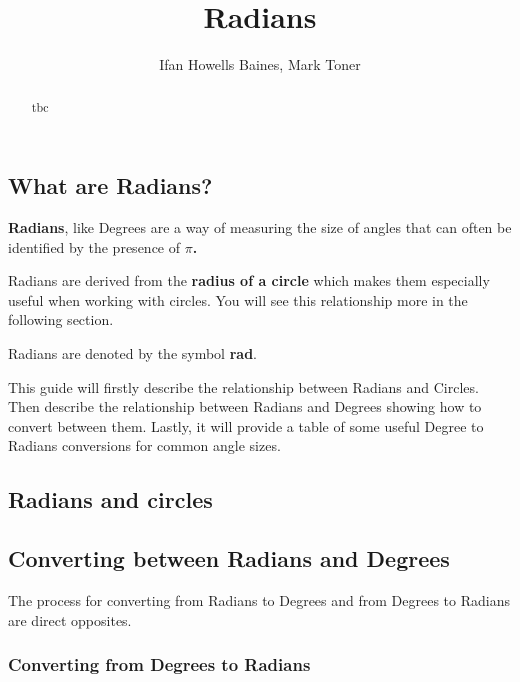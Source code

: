 \documentclass[
  12pt,
  a4paper, oneside]{starmastarticle}
\title{Radians}
\author{Ifan Howells Baines, Mark Toner}
\date{}
\begin{document}
\maketitle
\begin{abstract}
tbc
\end{abstract}
\ifdefined\Shaded\renewenvironment{Shaded}{\begin{tcolorbox}[sharp corners, breakable, interior hidden, frame hidden, borderline west={3pt}{0pt}{shadecolor}, boxrule=0pt, enhanced]}{\end{tcolorbox}}\fi

\hypertarget{what-are-radians}{%
\subsection*{What are Radians?}\label{what-are-radians}}

\textbf{Radians}, like Degrees are a way of measuring the size of angles
that can often be identified by the presence of \textbf{\(\pi\).}

Radians are derived from the \textbf{radius of a circle} which makes
them especially useful when working with circles. You will see this
relationship more in the following section.

Radians are denoted by the symbol \textbf{rad}.

This guide will firstly describe the relationship between Radians and
Circles. Then describe the relationship between Radians and Degrees
showing how to convert between them. Lastly, it will provide a table of
some useful Degree to Radians conversions for common angle sizes.

\hypertarget{radians-and-circles}{%
\subsection{Radians and circles}\label{radians-and-circles}}

\hypertarget{converting-between-radians-and-degrees}{%
\subsection{Converting between Radians and
Degrees}\label{converting-between-radians-and-degrees}}

The process for converting from Radians to Degrees and from Degrees to
Radians are direct opposites.

\hypertarget{converting-from-degrees-to-radians}{%
\subsubsection{Converting from Degrees to
Radians}\label{converting-from-degrees-to-radians}}
\end{document}
